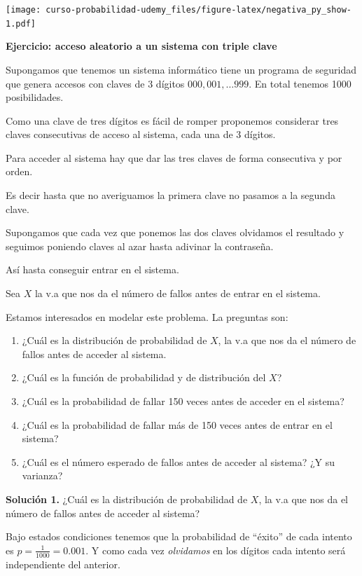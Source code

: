 \documentclass[]{book}
\providecommand{\tightlist}{%
  \setlength{\itemsep}{0pt}\setlength{\parskip}{0pt}}
\begin{document}
\texttt{[image: curso-probabilidad-udemy\_files/figure-latex/negativa\_py\_show-1.pdf]}

\textbf{Ejercicio: acceso aleatorio a un sistema con triple clave}

Supongamos que tenemos un sistema informático tiene un programa de seguridad que genera accesos con claves de 3 dígitos \(000,001,\ldots 999\). En total tenemos 1000 posibilidades.

Como una clave de tres dígitos es fácil de romper proponemos considerar tres claves consecutivas de acceso al sistema, cada una de 3 dígitos.

Para acceder al sistema hay que dar las tres claves de forma consecutiva y por orden.

Es decir hasta que no averiguamos la primera clave no pasamos a la segunda clave.

Supongamos que cada vez que ponemos las dos claves olvidamos el resultado y seguimos poniendo claves al azar hasta adivinar la contraseña.

Así hasta conseguir entrar en el sistema.

Sea \(X\) la v.a que nos da el número de fallos antes de entrar en el sistema.

Estamos interesados en modelar este problema. La preguntas son:

\begin{enumerate}
\def\labelenumi{\arabic{enumi}.}
\tightlist
\item
  ¿Cuál es la distribución de probabilidad de \(X\), la v.a que nos da el número de fallos antes de acceder al sistema.
\item
  ¿Cuál es la función de probabilidad y de distribución del \(X\)?
\item
  ¿Cuál es la probabilidad de fallar 150 veces antes de acceder en el sistema?
\item
  ¿Cuál es la probabilidad de fallar más de 150 veces antes de entrar en el sistema?
\item
  ¿Cuál es el número esperado de fallos antes de acceder al sistema? ¿Y su varianza?
\end{enumerate}

\textbf{Solución 1.} ¿Cuál es la distribución de probabilidad de \(X\), la v.a que nos da el número de fallos antes de acceder al sistema?

Bajo estados condiciones tenemos que la probabilidad de ``éxito'' de cada intento es \(p=\frac{1}{1000}=0.001\). Y como cada vez \emph{olvidamos} en los dígitos cada intento será independiente del anterior.
\end{document}
